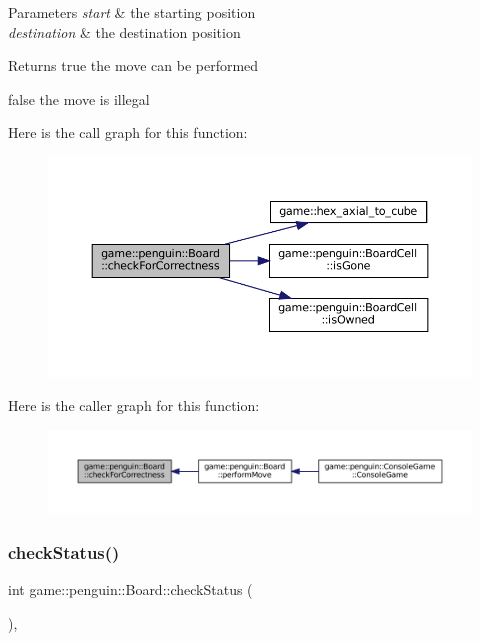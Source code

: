\begin{DoxyParams}{Parameters}
{\em start} & the starting position \\
\hline
{\em destination} & the destination position \\
\hline
\end{DoxyParams}
\begin{DoxyReturn}{Returns}
true the move can be performed 

false the move is illegal 
\end{DoxyReturn}
Here is the call graph for this function\+:
\nopagebreak
\begin{figure}[H]
\begin{center}
\leavevmode
\includegraphics[width=350pt]{classgame_1_1penguin_1_1_board_a2864b1af9dbdf19273185c504257435c_cgraph}
\end{center}
\end{figure}
Here is the caller graph for this function\+:
\nopagebreak
\begin{figure}[H]
\begin{center}
\leavevmode
\includegraphics[width=350pt]{classgame_1_1penguin_1_1_board_a2864b1af9dbdf19273185c504257435c_icgraph}
\end{center}
\end{figure}
\mbox{\label{classgame_1_1penguin_1_1_board_a3d659743bc33b43168c82dc4e2d3b00e}} 
\subsubsection{\texorpdfstring{check\+Status()}{checkStatus()}}
{\footnotesize\ttfamily int game\+::penguin\+::\+Board\+::check\+Status (\begin{DoxyParamCaption}{ }\end{DoxyParamCaption})\hspace{0.3cm}{\ttfamily [override]}, {\ttfamily [virtual]}}



